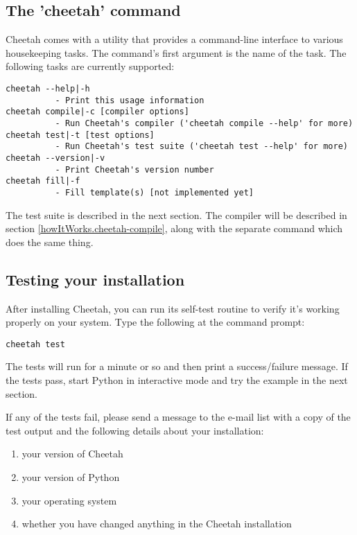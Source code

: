 \subsection{The 'cheetah' command}
\label{gettingStarted.cheetah}

Cheetah comes with a utility  that provides a command-line
interface to various housekeeping tasks.  The command's first argument is
the name of the task.  The following tasks are currently supported:

\begin{verbatim}
cheetah --help|-h            
          - Print this usage information
cheetah compile|-c [compiler options]
          - Run Cheetah's compiler ('cheetah compile --help' for more)
cheetah test|-t [test options]
          - Run Cheetah's test suite ('cheetah test --help' for more)
cheetah --version|-v
          - Print Cheetah's version number
cheetah fill|-f
          - Fill template(s) [not implemented yet]
\end{verbatim}

The test suite is described in the next section.  The compiler will be
described in section \ref{howItWorks.cheetah-compile}, along with the
separate  command which does the same thing.

\subsection{Testing your installation}
\label{gettingStarted.test}

After installing Cheetah, you can run its self-test routine to verify it's
working properly on your system.  Type the following at the command prompt:
\begin{verbatim}
cheetah test 
\end{verbatim}

The tests will run for a minute or so and then print a success/failure message.
If the tests pass, start Python in interactive mode and try the example in the
next section.

If any of the tests fail, please send a message to the e-mail list with a copy
of the test output and the following details about your installation:

\begin{enumerate}
\item your version of Cheetah
\item your version of Python
\item your operating system
\item whether you have changed anything in the Cheetah installation
\end{enumerate}

